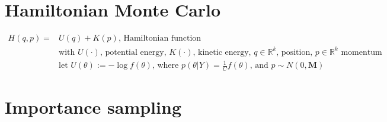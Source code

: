 \documentclass{article}
\begin{document}
\section{Hamiltonian Monte Carlo}

\begin{align*}
  H(q, p) =& U(q) + K(p) \textrm{, Hamiltonian function}\\
  & \textrm{with $U(\cdot)$, potential energy, $K(\cdot)$, kinetic energy, $q \in \mathbb{R}^k$, position, $p \in \mathbb{R}^k$ momentum}\\
  & \textrm{let } U(\theta) := -\log f(\theta) \textrm{, where } p(\theta | Y) = \frac{1}{C}f(\theta) \textrm{, and } p \sim N(0, \textbf{M})
\end{align*}

\section{Importance sampling}
\end{document}
